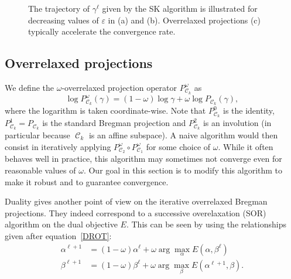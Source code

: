 \documentclass{article} %
\DeclareMathOperator{\Ccal}{\mathcal{C}}
\renewcommand{\epsilon}{\varepsilon}
\theoremstyle{plain}
\theoremstyle{definition}
\theoremstyle{remark}
\begin{document}
\begin{figure}[ht!]
\centering
\begin{minipage}[b]{.33\linewidth}
   \centering
   
                    \subcaption{}\label{fig:schema_a}
\end{minipage}%
\begin{minipage}[b]{.33\linewidth}
   \centering
   
                    \subcaption{}\label{fig:schema_b}
\end{minipage}%
\begin{minipage}[b]{.33\linewidth}
   \centering
   
                    \subcaption{}\label{fig:schema_c}
\end{minipage}%
\caption{\label{alternate_projections} The trajectory of $\gamma^{\ell}$ given by the SK algorithm is illustrated for decreasing values of $\epsilon$ in (a) and (b). Overrelaxed projections (c) typically accelerate the convergence rate.}
\end{figure}

\subsection{Overrelaxed projections}

We define the $\omega$-overrelaxed projection operator $P^\omega_{\Ccal_k}$ as
\begin{equation}\label{eq:def_or_proj}
\log P^\omega_{\Ccal_k}(\gamma) = (1-\omega) \log \gamma + \omega \log P_{\Ccal_k}(\gamma),
\end{equation}
where the logarithm is taken coordinate-wise.
Note that $P_{\Ccal_k}^0$ is the identity, $P_{\Ccal_k}^1 = P_{\Ccal_k}$ is the standard Bregman projection and $P_{\Ccal_k}^2$ is an involution (in particular because $\Ccal_k$ is an affine subspace).
A naive algorithm would then consist in iteratively applying $P^\omega_{\Ccal_2}\circ P^\omega_{\Ccal_1}$ for some choice of $\omega$.
While it often behaves well in practice, this algorithm may sometimes not converge even for reasonable values of $\omega$.
Our goal in this section is to modify this algorithm to make it robust and to guarantee convergence.

Duality gives another point of view on the iterative overrelaxed Bregman projections. They indeed correspond to a successive overelaxation (SOR) algorithm on the dual objective $E$. This can be seen by using the relationships given after equation~\eqref{DROT}:
\begin{align}\label{SORdual}
\alpha^{\ell+1} &= (1-\omega)\alpha^{\ell} + \omega \arg \max_\alpha E(\alpha,\beta^{\ell})\\
\beta^{\ell + 1}&=(1-\omega) \beta^{\ell} + \omega \arg \max_\beta E(\alpha^{\ell+1},\beta).
\end{align} 
\end{document}
